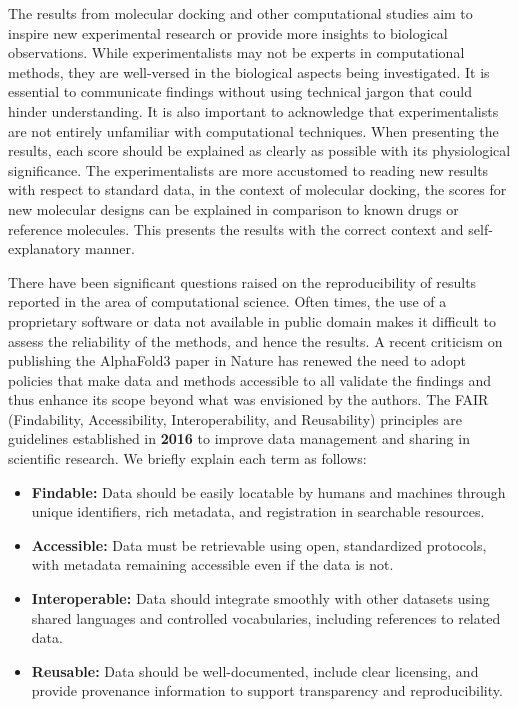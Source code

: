 %
The results from molecular docking and other computational studies aim to inspire new experimental research or provide more insights to biological observations. While experimentalists may not be experts in computational methods, they are well-versed in the biological aspects being investigated. It is essential to communicate findings without using technical jargon that could hinder understanding. It is also important to acknowledge that experimentalists are not entirely unfamiliar with computational techniques. When presenting the results, each score should be explained as clearly as possible with its physiological significance. The experimentalists are more accustomed to reading new results with respect to standard data, in the context of molecular docking, the scores for new molecular designs can be explained in comparison to known drugs or reference molecules. This presents the results with the correct context and self-explanatory manner. 
    
%
There have been significant questions raised on the reproducibility of results reported in the area of computational science\cite{bib58, bib59}. Often times, the use of a proprietary software or data not available in public domain makes it difficult to assess the reliability of the methods, and hence the results. A recent criticism on publishing the AlphaFold3 paper in Nature\cite{bib57} has renewed the need to adopt policies that make data and methods accessible to all validate the findings and thus enhance its scope beyond what was envisioned by the authors. The FAIR (Findability, Accessibility, Interoperability, and Reusability) principles are guidelines established in \textbf{2016} to improve data management and sharing in scientific research\cite{bib60}. 
We briefly explain each term as follows: 
\begin{itemize}
    \item \textbf{Findable:} Data should be easily locatable by humans and machines through unique identifiers, rich metadata, and registration in searchable resources.
    \item \textbf{Accessible:} Data must be retrievable using open, standardized protocols, with metadata remaining accessible even if the data is not.
    \item \textbf{Interoperable:} Data should integrate smoothly with other datasets using shared languages and controlled vocabularies, including references to related data.
    \item \textbf{Reusable:} Data should be well-documented, include clear licensing, and provide provenance information to support transparency and reproducibility.
\end{itemize}

